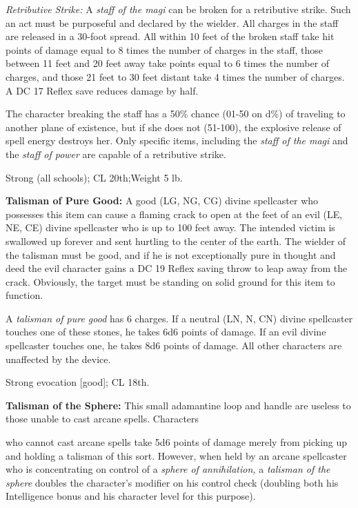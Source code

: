 \documentclass{article}
\begin{document}
\textit{Retributive Strike: }A \textit{staff of the magi }can be broken for a retributive 
strike. Such an act must be purposeful and declared by the wielder. All charges 
in the staff are released in a 30-foot spread. All within 10 feet of the broken 
staff take hit points of damage equal to 8 times the number of charges in the staff, 
those between 11 feet and 20 feet away take points equal to 6 times the number 
of charges, and those 21 feet to 30 feet distant take 4 times the number of charges. 
A DC 17 Reflex save reduces damage by half. 

The character breaking the staff has a 50\% chance (01-50 on d\%) of traveling 
to another plane of existence, but if she does not (51-100), the explosive release 
of spell energy destroys her. Only specific items, including the \textit{staff 
of the magi }and the \textit{staff of power} are capable of a retributive strike.

Strong (all schools); CL 20th;Weight 5 lb.

\vspace{12pt}
\textbf{Talisman of Pure Good:} A good (LG, NG, CG) divine spellcaster who possesses 
this item can cause a flaming crack to open at the feet of an evil (LE, NE, CE) 
divine spellcaster who is up to 100 feet away. The intended victim is swallowed 
up forever and sent hurtling to the center of the earth. The wielder of the talisman 
must be good, and if he is not exceptionally pure in thought and deed the evil 
character gains a DC 19 Reflex saving throw to leap away from the crack. Obviously, 
the target must be standing on solid ground for this item to function. 

A \textit{talisman of pure good }has 6 charges. If a neutral (LN, N, CN) divine 
spellcaster touches one of these stones, he takes 6d6 points of damage. If an evil 
divine spellcaster touches one, he takes 8d6 points of damage. All other characters 
are unaffected by the device.

Strong evocation [good]; CL 18th.

\vspace{12pt}
\textbf{Talisman of the Sphere:} This small adamantine loop and handle are useless 
to those unable to cast arcane spells. Characters

who cannot cast arcane spells take 5d6 points of damage merely from picking up 
and holding a talisman of this sort. However, when held by an arcane spellcaster 
who is concentrating on control of a \textit{sphere of annihilation, }a \textit{talisman 
of the sphere }doubles the character's modifier on his control check (doubling 
both his Intelligence bonus and his character level for this purpose).
\end{document}
